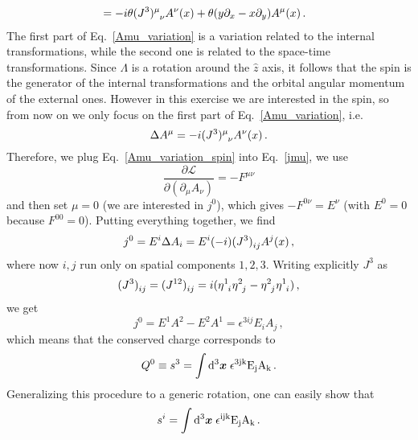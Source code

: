 \begin{sol}
\begin{align}
            &= -i\theta \tensor{(J^3)}{^\mu _\nu} A^{\nu}(x) + \theta(y\partial_{x} - x\partial_{y})A^{\mu}(x) \, .\label{Amu_variation}
    \end{align}
    The first part of Eq.~\eqref{Amu_variation} is a variation related to the internal transformations, while the second one is related to the space-time transformations.
    Since $\Lambda$ is a rotation around the $\hat{z}$ axis, it follows that the spin is the generator of the internal transformations and the orbital angular momentum of the external ones.
    However in this exercise we are interested in the spin, so from now on we only focus on the first part of Eq.~\eqref{Amu_variation}, i.e.
    \begin{equation}
    \label{Amu_variation_spin}
    \Delta A^{\mu} = -i \tensor{(J^3)}{^\mu _\nu} A^{\nu}(x)\,.
    \end{equation}
    Therefore, we plug Eq.~\eqref{Amu_variation_spin} into Eq.~\eqref{jmu}, we use
    \begin{equation}
        \frac{\partial \mathcal{L}}{\partial(\partial_{\mu}A_{\nu})} = -F^{\mu \nu} 
    \end{equation}
    and then set $\mu = 0$ (we are interested in $j^{0}$), which gives $-F^{0\nu} = E^{\nu}$ (with $E^{0} = 0$ because $F^{00} = 0$).
    Putting everything together, we find
    \begin{equation}
        j^{0} = E^{i}\Delta A_{i} = E^{i}(-i)\tensor{(J^3)}{_i_j} A^{j}(x)\, , 
    \end{equation}
    where now $i,j$ run only on spatial components $1,2,3$.  Writing explicitly $J^{3}$ as
    \begin{equation}
        \tensor{(J^3)}{_i_j} = \tensor{(J^{12})}{_i_j} = i(\tensor{\eta}{^1_i}\tensor{\eta}{^2_j} - \tensor{\eta}{^2_j}\tensor{\eta}{^1_i} )\, ,
    \end{equation}
    we get
    \begin{equation}
        j^{0} = E^{1}A^{2} - E^{2}A^{1} = \epsilon^{3ij}E_{i}A_{j}\,,
    \end{equation}
    which means that the conserved charge corresponds to
    \begin{equation}
            Q^{0} \equiv s^{3} = \int \rm{\rm d}^3\boldsymbol{x} \;\epsilon^{3jk}E_{j}A_{k}\,.
    \end{equation}
    Generalizing this procedure to a generic rotation, one can easily show that 
    \begin{equation}
    \label{eq_si}
        s^{i} = \int \rm\rmd^3\vx \;\epsilon^{ijk}E_{j}A_{k}\, .

\end{equation}
\end{sol}
